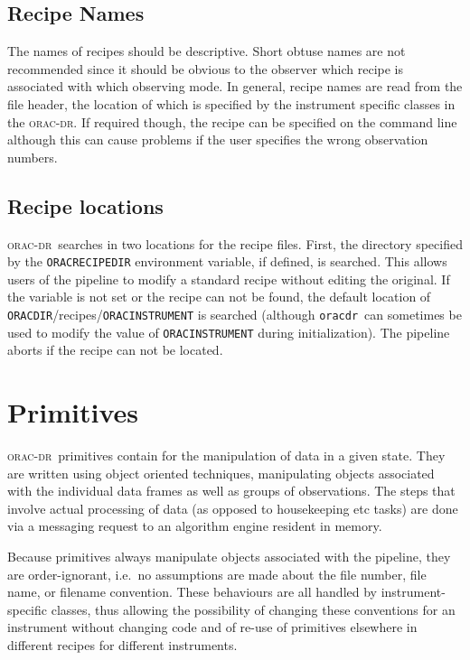 \documentclass[twoside,11pt]{article}
\renewcommand{\_}{\texttt{\symbol{95}}}
\newcommand{\Oracdr}{\textsc{orac-dr}}
\newcommand{\oracdr}{\texttt{oracdr}}
\begin{document}
\subsection{Recipe Names}

The names of recipes should be descriptive. Short obtuse names are not
recommended since it should be obvious to the observer which recipe is
associated with which observing mode. In general, recipe names are
read from the file header, the location of which is specified by the
instrument specific classes in the \Oracdr. If required though, the
recipe can be specified on the command line although this can cause
problems if the user specifies the wrong observation numbers.

\subsection{Recipe locations}

\Oracdr\ searches in two locations for the recipe files. First, the
directory specified by the \texttt{ORAC\_\-RECIPE\_DIR} environment
variable, if defined, is searched. This allows users of the pipeline
to modify a standard recipe without editing the original. If the
variable is not set or the recipe can not be found, the default
location of \texttt{ORAC\_DIR}/recipes/\texttt{ORAC\_INSTRUMENT} is
searched (although \oracdr\ can sometimes be used to modify the value
of
\texttt{ORAC\_INSTRUMENT} during initialization). The pipeline
aborts if the recipe can not be located.



\section{Primitives}

\Oracdr\ primitives contain for the manipulation of data in a
given state. They are written using object oriented techniques,
manipulating objects associated with the individual data frames as
well as groups of observations. The steps that involve actual
processing of data (as opposed to housekeeping etc tasks) are done via
a messaging request to an algorithm engine resident in memory.

Because primitives always manipulate objects associated with the
pipeline, they are order-ignorant, i.e.\ no assumptions are made about
the file number, file name, or filename convention. These behaviours
are all handled by instrument-specific classes, thus allowing the
possibility of changing these conventions for an instrument without
changing code and of re-use of primitives elsewhere in different
recipes for different instruments.
\end{document}
